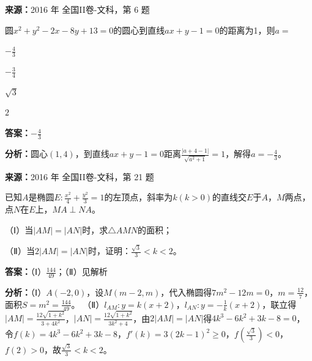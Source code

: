 \begin{question}[points=5]
\textbf{来源：}2016 年 全国II卷-文科，第 6 题\par
圆$x^2+y^2-2x-8y+13=0$的圆心到直线$ax+y-1=0$的距离为1，则$a=$
\begin{choices}
  \item $-\frac{4}{3}$
  \item $-\frac{3}{4}$
  \item $\sqrt{3}$
  \item $2$
\end{choices}
\begin{solution}
\textbf{答案：}$-\frac{4}{3}$

\textbf{分析：}圆心$(1,4)$，到直线$ax+y-1=0$距离$\frac{|a+4-1|}{\sqrt{a^2+1}}=1$，解得$a=-\frac{4}{3}$。
\end{solution}
\end{question}

\begin{question}[points=12]
\textbf{来源：}2016 年 全国II卷-文科，第 21 题\par
已知$A$是椭圆$E:\frac{x^2}{4}+\frac{y^2}{3}=1$的左顶点，斜率为$k(k>0)$的直线交$E$于$A$，$M$两点，点$N$在$E$上，$MA\perp NA$。

（Ⅰ）当$|AM|=|AN|$时，求$\triangle AMN$的面积；

（Ⅱ）当$2|AM|=|AN|$时，证明：$\frac{\sqrt{3}}{3}<k<2$。
\begin{solution}
\textbf{答案：}（Ⅰ）$\frac{144}{49}$；（Ⅱ）见解析

\textbf{分析：}（Ⅰ）$A(-2,0)$，设$M(m-2,m)$，代入椭圆得$7m^2-12m=0$，$m=\frac{12}{7}$，面积$S=m^2=\frac{144}{49}$。
（Ⅱ）$l_{AM}:y=k(x+2)$，$l_{AN}:y=-\frac{1}{k}(x+2)$，联立得$|AM|=\frac{12\sqrt{1+k^2}}{3+4k^2}$，$|AN|=\frac{12\sqrt{1+k^2}}{3k^2+4}$，由$2|AM|=|AN|$得$4k^3-6k^2+3k-8=0$，令$f(k)=4k^3-6k^2+3k-8$，$f'(k)=3(2k-1)^2\ge0$，$f(\frac{\sqrt{3}}{3})<0$，$f(2)>0$，故$\frac{\sqrt{3}}{3}<k<2$。
\end{solution}
\end{question}

